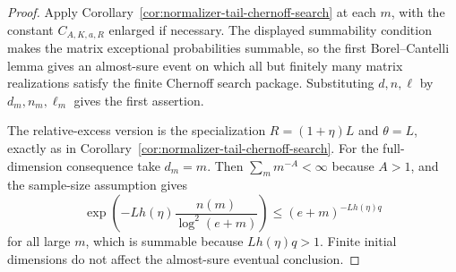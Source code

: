 \documentclass[11pt]{amsart}
\numberwithin{equation}{section}
\theoremstyle{definition}
\theoremstyle{remark}
\begin{document}
\begin{proof}
Apply Corollary~\ref{cor:normalizer-tail-chernoff-search} at each \(m\), with
the constant \(C_{A,K,a,R}\) enlarged if necessary.  The displayed summability
condition makes the matrix exceptional probabilities summable, so the first
Borel--Cantelli lemma gives an almost-sure event on which all but finitely many
matrix realizations satisfy the finite Chernoff search package.  Substituting
\(d,n,\ell\) by \(d_m,n_m,\ell_m\) gives the first assertion.

The relative-excess version is the specialization \(R=(1+\eta)L\) and
\(\theta=L\), exactly as in Corollary~\ref{cor:normalizer-tail-chernoff-search}.
For the full-dimension consequence take \(d_m=m\).  Then
\(\sum_m m^{-A}<\infty\) because \(A>1\), and the sample-size assumption gives
\[
  \exp\left(-Lh(\eta)\frac{n(m)}{\log^2(e+m)}\right)
  \le (e+m)^{-Lh(\eta)q}
\]
for all large \(m\), which is summable because \(Lh(\eta)q>1\).  Finite initial
dimensions do not affect the almost-sure eventual conclusion.
\end{proof}
\end{document}
